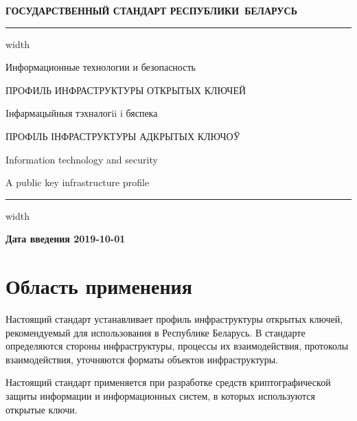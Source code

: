 \begin{center}
{\bfseries
ГОСУДАРСТВЕННЫЙ СТАНДАРТ РЕСПУБЛИКИ~БЕЛАРУСЬ
\vskip 2pt
\hrule width\textwidth

\vskip 9pt

Информационные технологии и безопасность

ПРОФИЛЬ ИНФРАСТРУКТУРЫ ОТКРЫТЫХ КЛЮЧЕЙ

\vskip 9pt

Iнфармацыйныя тэхналогii i бяспека

ПРОФІЛЬ ІНФРАСТРУКТУРЫ АДКРЫТЫХ КЛЮЧОЎ
} %

\vskip 9pt

Information technology and security

A public key infrastructure profile

\vskip 4pt                
\hrule width \textwidth
\end{center}

\mbox{}\hfill{\bfseries Дата введения 2019-10-01}

\chapter{Область применения}

Настоящий стандарт устанавливает профиль инфраструктуры открытых ключей,
рекомендуемый для использования в Республике Беларусь.
%
В стандарте определяются стороны инфраструктуры, процессы их взаимодействия,
протоколы взаимодействия, уточняются форматы объектов инфраструктуры.

Настоящий стандарт применяется при разработке средств 
криптографической защиты информации и информационных систем, в которых 
используются открытые ключи.  



